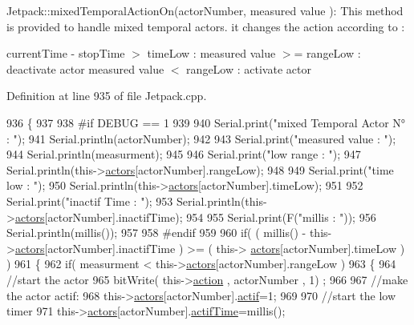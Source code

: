 Jetpack\+::mixed\+Temporal\+Action\+On(actor\+Number, measured value )\+: This method is provided to handle mixed temporal actors. it changes the action according to \+:

current\+Time -\/ stop\+Time $>$ time\+Low \+: measured value $>$= range\+Low \+: deactivate actor measured value $<$ range\+Low \+: activate actor 

Definition at line 935 of file Jetpack.\+cpp.


\begin{DoxyCode}
936 \{
937 
938 \textcolor{preprocessor}{#if DEBUG == 1}
939     
940     Serial.print(\textcolor{stringliteral}{"mixed Temporal Actor N° : "});
941     Serial.println(actorNumber);
942 
943     Serial.print(\textcolor{stringliteral}{"measured value : "});
944     Serial.println(measurment);
945 
946     Serial.print(\textcolor{stringliteral}{"low range : "});
947     Serial.println(this->\hyperlink{class_jetpack_a7e16d2f97837f9712a2e6de1c50d99db}{actors}[actorNumber].rangeLow);
948 
949     Serial.print(\textcolor{stringliteral}{"time low : "});
950     Serial.println(this->\hyperlink{class_jetpack_a7e16d2f97837f9712a2e6de1c50d99db}{actors}[actorNumber].timeLow);
951 
952     Serial.print(\textcolor{stringliteral}{"inactif Time : "});
953     Serial.println(this->\hyperlink{class_jetpack_a7e16d2f97837f9712a2e6de1c50d99db}{actors}[actorNumber].inactifTime);
954 
955     Serial.print(F(\textcolor{stringliteral}{"millis : "}));
956     Serial.println(millis());
957 
958 \textcolor{preprocessor}{#endif}
959 
960     \textcolor{keywordflow}{if}( ( millis() - this->\hyperlink{class_jetpack_a7e16d2f97837f9712a2e6de1c50d99db}{actors}[actorNumber].inactifTime ) >= (  this->
      \hyperlink{class_jetpack_a7e16d2f97837f9712a2e6de1c50d99db}{actors}[actorNumber].timeLow  ) )
961     \{
962         \textcolor{keywordflow}{if}( measurment < this->\hyperlink{class_jetpack_a7e16d2f97837f9712a2e6de1c50d99db}{actors}[actorNumber].rangeLow )
963         \{
964             \textcolor{comment}{//start the actor}
965             bitWrite( this->\hyperlink{class_jetpack_aca3142925a7b0834b34ae91d26af7765}{action} , actorNumber , 1) ;
966 
967             \textcolor{comment}{//make the actor actif:}
968             this->\hyperlink{class_jetpack_a7e16d2f97837f9712a2e6de1c50d99db}{actors}[actorNumber].\hyperlink{struct_jetpack_1_1state_aa177541689bbaea21a4650a083b0df77}{actif}=1;
969 
970             \textcolor{comment}{//start the low timer}
971             this->\hyperlink{class_jetpack_a7e16d2f97837f9712a2e6de1c50d99db}{actors}[actorNumber].\hyperlink{struct_jetpack_1_1state_af2e1cc323ef9ffcc3cf4d203f85d726b}{actifTime}=millis();

\end{DoxyCode}
